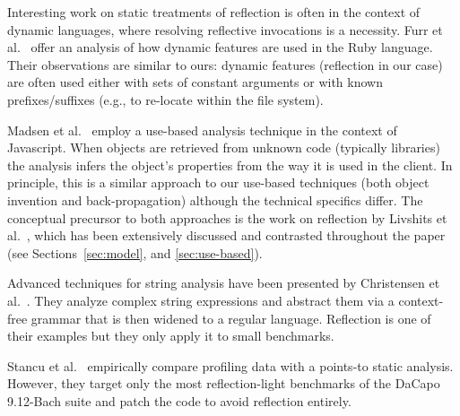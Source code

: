 Interesting work on static treatments of reflection is often in the
context of dynamic languages, where resolving reflective invocations
is a necessity.  
Furr et al.~\cite{oopsla/FurrAF09}
offer an analysis of how dynamic features are used in the Ruby
language. Their observations are similar to ours: dynamic features
(reflection in our case) are often used either with sets of constant
arguments
or with known prefixes/suffixes (e.g., to re-locate within the file system).

Madsen et al.~\cite{sigsoft/MadsenLF13} employ a use-based analysis
technique in the context of Javascript. When objects are retrieved
from unknown code (typically libraries) the analysis infers the
object's properties from the way it is used in the client. In
principle, this is a similar approach to our use-based techniques
(both object invention and back-propagation) although the technical
specifics differ. The conceptual precursor to both approaches is the
work on reflection by Livshits et
al.~\cite{aplas/LivshitsWL05,livshits:thesis}, which has been
extensively discussed and contrasted throughout the paper (see
Sections~\ref{sec:model}, and \ref{sec:use-based}).

Advanced techniques for string analysis have been presented by
Christensen et al.~\cite{sas/ChristensenMS03}. They analyze complex
string expressions and abstract them via a context-free grammar that
is then widened to a regular language. Reflection is one of their
examples but they only apply it to small benchmarks.



Stancu et al.~\cite{pppj/StancuWBLF14} empirically
compare profiling data with a points-to static analysis.
However, they target only the most
reflection-light benchmarks of the DaCapo 9.12-Bach suite
and patch the code to avoid reflection entirely.

